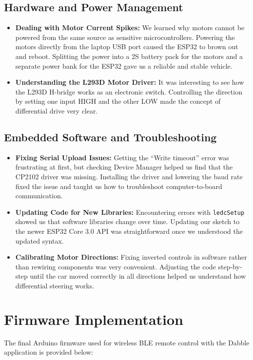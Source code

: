 \documentclass[11pt,a4paper]{article}
\begin{document}
\subsection*{Hardware and Power Management}
\begin{itemize}
    \item \textbf{Dealing with Motor Current Spikes:} We learned why motors cannot be powered from the same source as sensitive microcontrollers. Powering the motors directly from the laptop USB port caused the ESP32 to brown out and reboot. Splitting the power into a 2S battery pack for the motors and a separate power bank for the ESP32 gave us a reliable and stable vehicle.
    \item \textbf{Understanding the L293D Motor Driver:} It was interesting to see how the L293D H-bridge works as an electronic switch. Controlling the direction by setting one input HIGH and the other LOW made the concept of differential drive very clear.
\end{itemize}

\subsection*{Embedded Software and Troubleshooting}
\begin{itemize}
    \item \textbf{Fixing Serial Upload Issues:} Getting the ``Write timeout'' error was frustrating at first, but checking Device Manager helped us find that the CP2102 driver was missing. Installing the driver and lowering the baud rate fixed the issue and taught us how to troubleshoot computer-to-board communication.
    \item \textbf{Updating Code for New Libraries:} Encountering errors with \texttt{ledcSetup} showed us that software libraries change over time. Updating our sketch to the newer ESP32 Core 3.0 API was straightforward once we understood the updated syntax.
    \item \textbf{Calibrating Motor Directions:} Fixing inverted controls in software rather than rewiring components was very convenient. Adjusting the code step-by-step until the car moved correctly in all directions helped us understand how differential steering works.
\end{itemize}

\section{Firmware Implementation}
The final Arduino firmware used for wireless BLE remote control with the Dabble application is provided below:
\end{document}
